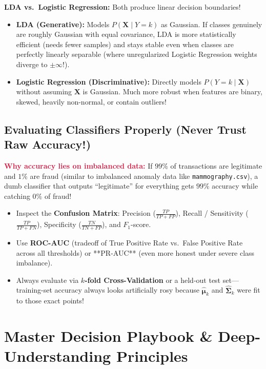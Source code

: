 \documentclass[11pt, a4paper]{article}
\begin{document}
\textbf{LDA vs.\ Logistic Regression:} Both produce linear decision boundaries!
\begin{itemize}
    \item \textbf{LDA (Generative):} Models $P(\mathbf{X} \mid Y=k)$ as Gaussian. If classes genuinely are roughly Gaussian with equal covariance, LDA is more statistically efficient (needs fewer samples) and stays stable even when classes are perfectly linearly separable (where unregularized Logistic Regression weights diverge to $\pm\infty$!).
    \item \textbf{Logistic Regression (Discriminative):} Directly models $P(Y=k \mid \mathbf{X})$ without assuming $\mathbf{X}$ is Gaussian. Much more robust when features are binary, skewed, heavily non-normal, or contain outliers!
\end{itemize}

\subsection{Evaluating Classifiers Properly (Never Trust Raw Accuracy!)}
\textcolor{crimson}{\textbf{Why accuracy lies on imbalanced data:}} If $99\%$ of transactions are legitimate and $1\%$ are fraud (similar to imbalanced anomaly data like \texttt{mammography.csv}), a dumb classifier that outputs ``legitimate'' for everything gets $99\%$ accuracy while catching $0\%$ of fraud!
\begin{itemize}
    \item Inspect the \textbf{Confusion Matrix}: Precision ($\frac{TP}{TP+FP}$), Recall / Sensitivity ($\frac{TP}{TP+FN}$), Specificity ($\frac{TN}{TN+FP}$), and $F_1$-score.
    \item Use \textbf{ROC-AUC} (tradeoff of True Positive Rate vs.\ False Positive Rate across all thresholds) or **PR-AUC** (even more honest under severe class imbalance).
    \item Always evaluate via \textbf{$k$-fold Cross-Validation} or a held-out test set---training-set accuracy always looks artificially rosy because $\hat{\boldsymbol{\mu}}_k$ and $\hat{\boldsymbol{\Sigma}}_k$ were fit to those exact points!
\end{itemize}

\newpage

\section{Master Decision Playbook \& Deep-Understanding Principles}
\end{document}
